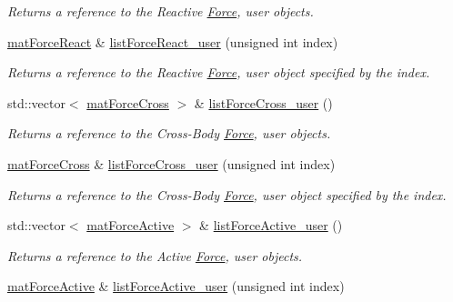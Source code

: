 \begin{DoxyCompactItemize}
\begin{DoxyCompactList}\small\item\em Returns a reference to the Reactive \hyperlink{classosea_1_1ofreq_1_1_force}{Force}, user objects. \end{DoxyCompactList}\item 
\hyperlink{classosea_1_1ofreq_1_1mat_force_react}{mat\-Force\-React} \& \hyperlink{classosea_1_1ofreq_1_1mat_body_a53cbb789ae423084375b024954bf21f0}{list\-Force\-React\-\_\-user} (unsigned int index)
\begin{DoxyCompactList}\small\item\em Returns a reference to the Reactive \hyperlink{classosea_1_1ofreq_1_1_force}{Force}, user object specified by the index. \end{DoxyCompactList}\item 
std\-::vector$<$ \hyperlink{classosea_1_1ofreq_1_1mat_force_cross}{mat\-Force\-Cross} $>$ \& \hyperlink{classosea_1_1ofreq_1_1mat_body_a5dc37a8bb5143f2034ef6491969b2abe}{list\-Force\-Cross\-\_\-user} ()
\begin{DoxyCompactList}\small\item\em Returns a reference to the Cross-\/\-Body \hyperlink{classosea_1_1ofreq_1_1_force}{Force}, user objects. \end{DoxyCompactList}\item 
\hyperlink{classosea_1_1ofreq_1_1mat_force_cross}{mat\-Force\-Cross} \& \hyperlink{classosea_1_1ofreq_1_1mat_body_ae508a1904283a46d1fc5893da4080630}{list\-Force\-Cross\-\_\-user} (unsigned int index)
\begin{DoxyCompactList}\small\item\em Returns a reference to the Cross-\/\-Body \hyperlink{classosea_1_1ofreq_1_1_force}{Force}, user object specified by the index. \end{DoxyCompactList}\item 
std\-::vector$<$ \hyperlink{classosea_1_1ofreq_1_1mat_force_active}{mat\-Force\-Active} $>$ \& \hyperlink{classosea_1_1ofreq_1_1mat_body_a6a51e55baec56037eee824ec53af9b5d}{list\-Force\-Active\-\_\-user} ()
\begin{DoxyCompactList}\small\item\em Returns a reference to the Active \hyperlink{classosea_1_1ofreq_1_1_force}{Force}, user objects. \end{DoxyCompactList}\item 
\hyperlink{classosea_1_1ofreq_1_1mat_force_active}{mat\-Force\-Active} \& \hyperlink{classosea_1_1ofreq_1_1mat_body_a7d79de764dd75ad606a1cc9346b58676}{list\-Force\-Active\-\_\-user} (unsigned int index)

\end{DoxyCompactItemize}
